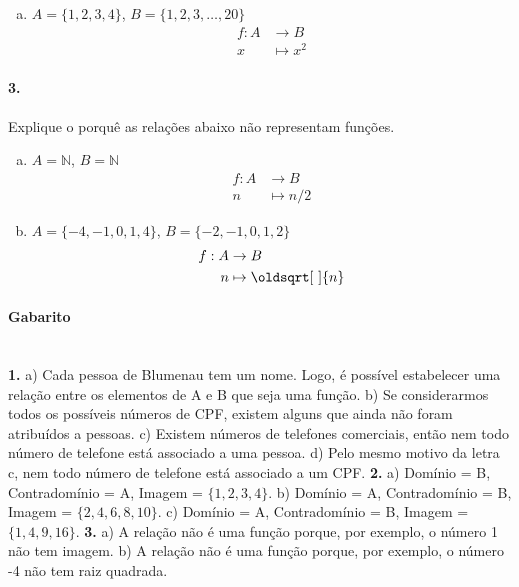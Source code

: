 \documentclass[a4paper,12pt]{article}
\renewcommand*{\sqrt}[2][\ ]{\oldsqrt[#1]{#2}}
\begin{document}
\begin{multicols}{2}
\begin{enumerate}[a)]
    \item $A = \{1, 2, 3, 4\}$, $B = \{1, 2, 3, \ldots, 20\}$
    $$\begin{aligned}
        f:A&\to B\\
        x&\mapsto x^2
    \end{aligned}$$
\end{enumerate}

\paragraph*{3.} Explique o porquê as relações abaixo não representam funções.

\begin{enumerate}[a)]

    \item $A = \mathbb{N}$, $B = \mathbb{N}$
    $$\begin{aligned}
        f:A&\to B\\ 
         n&\mapsto n/2
    \end{aligned}$$

    \item $A = \{-4,-1,0,1,4\}$, $B = \{-2,-1,0,1,2\}$
    $$\begin{aligned}
        f:A&\to B\\ 
            n&\mapsto \sqrt{n}
    \end{aligned}$$
\end{enumerate}

\end{multicols}
 

\vspace*{\fill}
{\footnotesize
\paragraph*{Gabarito} \hspace*{\fill}\\
\textbf{1.} a) Cada pessoa de Blumenau tem um nome. Logo, é possível estabelecer uma relação entre os elementos de A e B que seja uma função. b) Se considerarmos todos os possíveis números de CPF, existem alguns que ainda não foram atribuídos a pessoas. c) Existem números de telefones comerciais, então nem todo número de telefone está associado a uma pessoa. d) Pelo mesmo motivo da letra c, nem todo número de telefone está associado a um CPF.
\textbf{2.} a) Domínio = B, Contradomínio = A, Imagem = $\{1,2,3,4\}$. b) Domínio = A, Contradomínio = B, Imagem = $\{2,4,6,8,10\}$. c) Domínio = A, Contradomínio = B, Imagem = $\{1,4,9,16\}$.
\textbf{3.} a) A relação não é uma função porque, por exemplo, o número 1 não tem imagem. b) A relação não é uma função porque, por exemplo, o número -4 não tem raiz quadrada.
}
\end{document}
